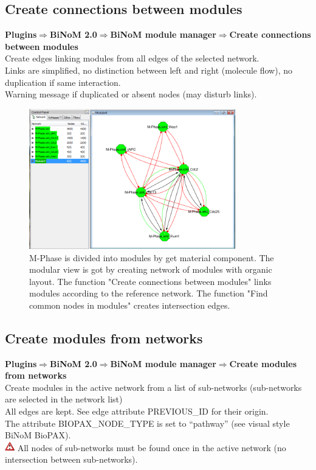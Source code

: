 \subsection{Create connections between modules}
\textbf{Plugins$\Rightarrow$BiNoM 2.0$\Rightarrow$BiNoM module manager$\Rightarrow$Create connections between modules}\\
Create edges linking modules from all edges of the selected network.\\
Links are simplified, no distinction between left and right (molecule flow), no duplication if same interaction.\\
Warning message if duplicated or absent nodes (may disturb links).
\begin{figure}
\centering
\includegraphics[width=0.8\textwidth]{graphics/M-Phase_Material_Modular}
\caption{M-Phase is divided into modules by get material component. The modular view is got by creating network of modules with organic layout. The function "Create connections between modules" links modules according to the reference network. The function "Find common nodes in modules" creates intersection edges. }
\label{M-Phase_Material_Modular}
\end{figure}

\subsection{Create modules from networks}
\textbf{Plugins$\Rightarrow$BiNoM 2.0$\Rightarrow$BiNoM module manager$\Rightarrow$Create modules from networks}\\
Create modules in the active network from a list of sub-networks (sub-networks are selected in the network list)\\
All edges are kept. See edge attribute PREVIOUS\_ID for their origin.\\
The attribute BIOPAX\_NODE\_TYPE is set to “pathway” (see visual style BiNoM BioPAX).\\
\includegraphics[width=12pt,height=12pt]{graphics/warning} All nodes of sub-networks must be found once in the active network (no intersection between sub-networks).

